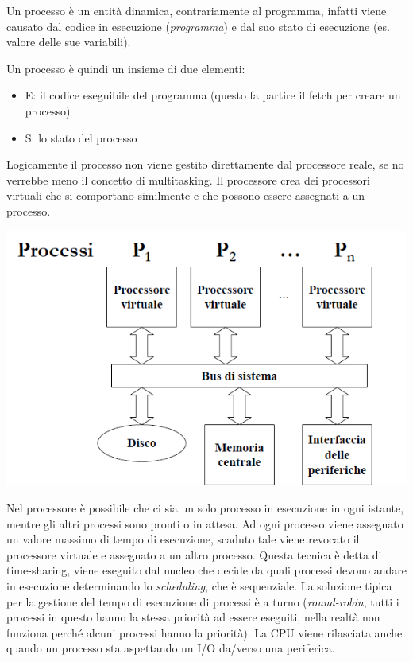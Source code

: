 \documentclass[
  paper=a4,
  oneside  ,captions=tableheading
]{scrbook}
\providecommand{\tightlist}{%
  \setlength{\itemsep}{0pt}\setlength{\parskip}{0pt}}
\begin{document}
Un processo è un entità dinamica, contrariamente al programma, infatti
viene causato dal codice in esecuzione (\emph{programma}) e dal suo
stato di esecuzione (es. valore delle sue variabili).

Un processo è quindi un insieme di due elementi:

\begin{itemize}
\tightlist
\item
  E: il codice eseguibile del programma (questo fa partire il fetch per
  creare un processo)
\item
  S: lo stato del processo
\end{itemize}

Logicamente il processo non viene gestito direttamente dal processore
reale, se no verrebbe meno il concetto di multitasking. Il processore
crea dei processori virtuali che si comportano similmente e che possono
essere assegnati a un processo.

\includegraphics{./image/image-20201123234616173.png}

Nel processore è possibile che ci sia un solo processo in esecuzione in
ogni istante, mentre gli altri processi sono pronti o in attesa. Ad ogni
processo viene assegnato un valore massimo di tempo di esecuzione,
scaduto tale viene revocato il processore virtuale e assegnato a un
altro processo. Questa tecnica è detta di time-sharing, viene eseguito
dal nucleo che decide da quali processi devono andare in esecuzione
determinando lo \emph{scheduling}, che è sequenziale. La soluzione
tipica per la gestione del tempo di esecuzione di processi è a turno
(\emph{round-robin}, tutti i processi in questo hanno la stessa priorità
ad essere eseguiti, nella realtà non funziona perché alcuni processi
hanno la priorità). La CPU viene rilasciata anche quando un processo sta
aspettando un I/O da/verso una periferica.
\end{document}
